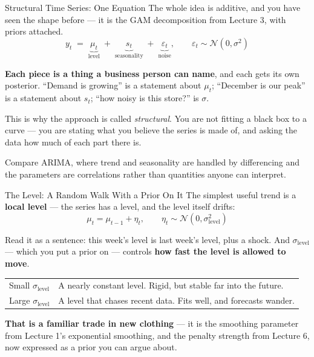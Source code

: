 \documentclass[aspectratio=169, 11pt]{beamer}
\begin{document}
\begin{frame}{Structural Time Series: One Equation}
  The whole idea is additive, and you have seen the shape before --- it is the GAM decomposition
  from Lecture 3, with priors attached.
  \[
    y_t \;=\; \underbrace{\mu_t}_{\text{level}} \;+\; \underbrace{s_t}_{\text{seasonality}}
      \;+\; \underbrace{\varepsilon_t}_{\text{noise}},
      \qquad \varepsilon_t \sim \mathcal{N}(0, \sigma^2)
  \]
  \vspace{-0.25cm}

  \textbf{Each piece is a thing a business person can name}, and each gets its own posterior.
  ``Demand is growing'' is a statement about $\mu_t$; ``December is our peak'' is a statement
  about $s_t$; ``how noisy is this store?'' is $\sigma$.

  \begin{keybox}
    This is why the approach is called \emph{structural}. You are not fitting a black box to a
    curve --- you are stating what you believe the series is made of, and asking the data how
    much of each part there is.
  \end{keybox}

  \vspace{0.1cm}
  Compare ARIMA, where trend and seasonality are handled by differencing and the parameters are
  correlations rather than quantities anyone can interpret.
\end{frame}

\begin{frame}{The Level: A Random Walk With a Prior On It}
  The simplest useful trend is a \textbf{local level} --- the series has a level, and the level
  itself drifts:
  \[
    \mu_t = \mu_{t-1} + \eta_t, \qquad \eta_t \sim \mathcal{N}(0, \sigma_{\text{level}}^2)
  \]
  \vspace{-0.25cm}

  Read it as a sentence: this week's level is last week's level, plus a shock. And
  $\sigma_{\text{level}}$ --- which you put a prior on --- controls \textbf{how fast the level is
  allowed to move}.

  \vspace{0.1cm}
  \begin{center}
    {\small
    \begin{tabular}{p{3.4cm}p{8.9cm}}
      \toprule
      Small $\sigma_{\text{level}}$ & A nearly constant level. Rigid, but stable far into the future. \\[3pt]
      Large $\sigma_{\text{level}}$ & A level that chases recent data. Fits well, and forecasts wander. \\
      \bottomrule
    \end{tabular}
    }
  \end{center}

  \vspace{0.05cm}
  \textbf{That is a familiar trade in new clothing} --- it is the smoothing parameter from
  Lecture 1's exponential smoothing, and the penalty strength from Lecture 6, now expressed as a
  prior you can argue about.
\end{frame}
\end{document}
